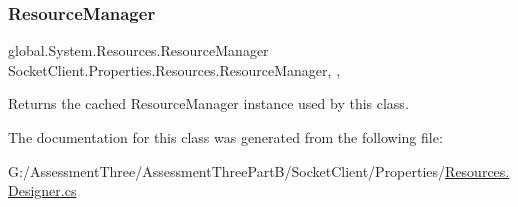 \subsubsection{\texorpdfstring{Resource\+Manager}{ResourceManager}}
{\footnotesize\ttfamily global.\+System.\+Resources.\+Resource\+Manager Socket\+Client.\+Properties.\+Resources.\+Resource\+Manager\hspace{0.3cm}{\ttfamily [static]}, {\ttfamily [get]}, {\ttfamily [package]}}



Returns the cached Resource\+Manager instance used by this class. 



The documentation for this class was generated from the following file\+:\begin{DoxyCompactItemize}
\item 
G\+:/\+Assessment\+Three/\+Assessment\+Three\+Part\+B/\+Socket\+Client/\+Properties/\hyperlink{_socket_client_2_properties_2_resources_8_designer_8cs}{Resources.\+Designer.\+cs}\end{DoxyCompactItemize}
